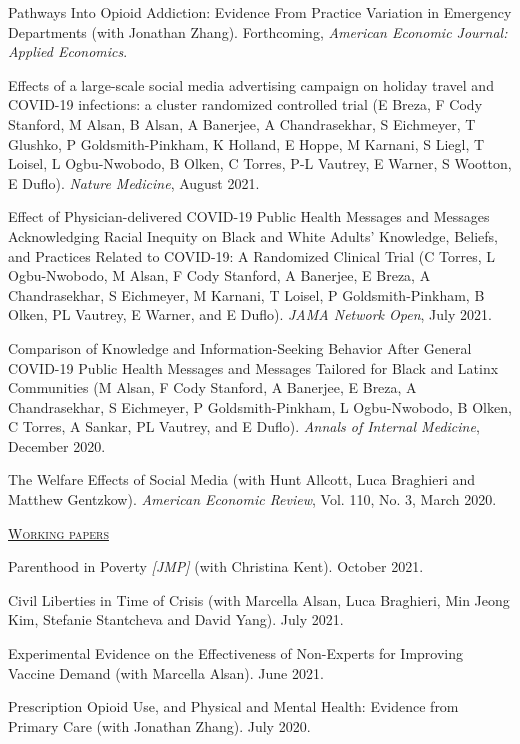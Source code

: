\documentclass[letterpaper,11pt]{article}
\begin{document}
Pathways Into Opioid Addiction: Evidence From Practice Variation in Emergency Departments (with Jonathan Zhang). Forthcoming, \textit{American Economic Journal: Applied Economics}.

Effects of a large-scale social media advertising campaign on holiday travel and COVID-19 infections: a cluster randomized controlled trial \footnotesize{(E Breza, F Cody Stanford, M Alsan, B Alsan, A Banerjee, A Chandrasekhar, S Eichmeyer, T Glushko, P Goldsmith-Pinkham, K Holland, E Hoppe, M Karnani, S Liegl, T Loisel, L Ogbu-Nwobodo, B Olken, C Torres, P-L Vautrey, E Warner, S Wootton, E Duflo)}. \textit{Nature Medicine}, August 2021.

Effect of Physician-delivered COVID-19 Public Health Messages and Messages Acknowledging Racial Inequity on Black and White Adults' Knowledge, Beliefs, and Practices Related to COVID-19: A Randomized Clinical Trial (C Torres, L Ogbu-Nwobodo, M Alsan, F Cody Stanford, A Banerjee, E Breza, A Chandrasekhar, S Eichmeyer, M Karnani, T Loisel, P Goldsmith-Pinkham, B Olken, PL Vautrey, E Warner, and E Duflo). \textit{JAMA Network Open}, July 2021.

Comparison of Knowledge and Information-Seeking Behavior After General COVID-19 Public Health Messages and Messages Tailored for Black and Latinx Communities (M Alsan, F Cody Stanford, A Banerjee, E Breza, A Chandrasekhar, S Eichmeyer, P Goldsmith-Pinkham, L Ogbu-Nwobodo, B Olken, C Torres, A Sankar, PL Vautrey, and E Duflo). \textit{Annals of Internal Medicine}, December 2020.
 
The Welfare Effects of Social Media (with Hunt Allcott, Luca Braghieri and Matthew Gentzkow). \textit{American Economic Review}, Vol. 110, No. 3, March 2020.

\bigskip

\underline {\textsc{Working papers}}

Parenthood in Poverty \textit{[JMP]} (with Christina Kent). October 2021.

Civil Liberties in Time of Crisis (with Marcella Alsan, Luca Braghieri, Min Jeong Kim, Stefanie Stantcheva and David Yang). July 2021.

Experimental Evidence on the Effectiveness of Non-Experts for Improving Vaccine Demand (with Marcella Alsan). June 2021.

Prescription Opioid Use, and Physical and Mental Health: Evidence from Primary Care (with Jonathan Zhang). July 2020.

 
 \bigskip
\end{document}
